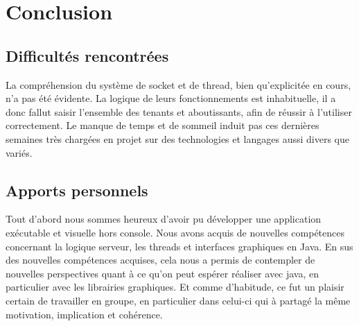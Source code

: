 \documentclass[a4paper,12pt]{report}
\begin{document}
  \chapter{Conclusion}

    \section{Difficultés rencontrées}
      La compréhension du système de socket et de thread, bien qu'explicitée en cours, n'a pas été évidente. La logique de leurs fonctionnements est inhabituelle, il a donc fallut saisir l'ensemble des tenants et aboutissants, afin de réussir à l'utiliser correctement.
      \medbreak
      Le manque de temps et de sommeil induit pas ces dernières semaines très chargées en projet sur des technologies et langages aussi divers que variés.

    \section{Apports personnels}
      Tout d'abord nous sommes heureux d'avoir pu développer une application exécutable et visuelle hors console.
      \medbreak
      Nous avons acquis de nouvelles compétences concernant la logique serveur, les threads et interfaces graphiques en Java.
      \medbreak
      En sus des nouvelles compétences acquises,  cela nous a permis de contempler de nouvelles perspectives quant à ce qu'on peut espérer réaliser  avec java, en particulier avec les librairies graphiques.
      \medbreak
      Et comme d'habitude, ce fut un plaisir certain de travailler en groupe, en particulier dans celui-ci qui à partagé la même motivation, implication et cohérence.
\end{document}
